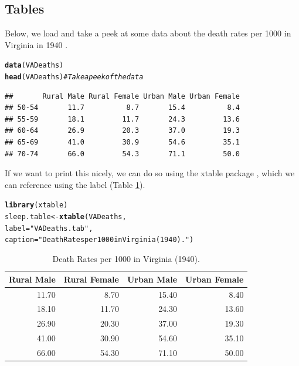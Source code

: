\documentclass{article}\usepackage[]{graphicx}\usepackage[]{xcolor}
\makeatletter
\newcommand{\hlsng}[1]{\textcolor[rgb]{0.192,0.494,0.8}{#1}}%
\newcommand{\hlcom}[1]{\textcolor[rgb]{0.678,0.584,0.686}{\textit{#1}}}%
\newcommand{\hldef}[1]{\textcolor[rgb]{0.345,0.345,0.345}{#1}}%
\newcommand{\hlkwb}[1]{\textcolor[rgb]{0.69,0.353,0.396}{#1}}%
\newcommand{\hlkwc}[1]{\textcolor[rgb]{0.333,0.667,0.333}{#1}}%
\newcommand{\hlkwd}[1]{\textcolor[rgb]{0.737,0.353,0.396}{\textbf{#1}}}%
\newenvironment{kframe}{%
 \def\at@end@of@kframe{}%
 \ifinner\ifhmode%
  \def\at@end@of@kframe{\end{minipage}}%
  \begin{minipage}{\columnwidth}%
 \fi\fi%
 \def\FrameCommand##1{\hskip\@totalleftmargin \hskip-\fboxsep
 \colorbox{shadecolor}{##1}\hskip-\fboxsep
     \hskip-\linewidth \hskip-\@totalleftmargin \hskip\columnwidth}%
 \MakeFramed {\advance\hsize-\width
   \@totalleftmargin\z@ \linewidth\hsize
   \@setminipage}}%
 {\par\unskip\endMakeFramed%
 \at@end@of@kframe}
\newenvironment{knitrout}{}{} %
\makeatother
\begin{document}
\begin{multicols}{2}
\subsection{Tables}
Below, we load and take a peek at some data about the death rates per 1000 in Virginia in 1940 \citep{deathRates}.
\begin{knitrout}\scriptsize
{}\color{fgcolor}\begin{kframe}
\begin{alltt}
\hlkwd{data}\hldef{(VADeaths)}
\hlkwd{head}\hldef{(VADeaths)} \hlcom{# Take a peek of the data}
\end{alltt}
\begin{verbatim}
##       Rural Male Rural Female Urban Male Urban Female
## 50-54       11.7          8.7       15.4          8.4
## 55-59       18.1         11.7       24.3         13.6
## 60-64       26.9         20.3       37.0         19.3
## 65-69       41.0         30.9       54.6         35.1
## 70-74       66.0         54.3       71.1         50.0
\end{verbatim}
\end{kframe}
\end{knitrout}
\indent If we want to print this nicely, we can do so using the xtable package \citep{xtable1}, which we can reference using the label (Table \ref{VADeaths.tab}).
\begin{knitrout}\scriptsize
{}\color{fgcolor}\begin{kframe}
\begin{alltt}
\hlkwd{library}\hldef{(xtable)}
\hldef{sleep.table}\hlkwb{<-}\hlkwd{xtable}\hldef{(VADeaths,}
                    \hlkwc{label} \hldef{=} \hlsng{"VADeaths.tab"}\hldef{,}
                    \hlkwc{caption} \hldef{=} \hlsng{"Death Rates per 1000 in Virginia (1940)."}\hldef{)}
\end{alltt}
\end{kframe}
\end{knitrout}
\begin{table}[H]
\centering
\begingroup\small
\begin{tabular}{rrrr}
  \hline
Rural Male & Rural Female & Urban Male & Urban Female \\ 
  \hline
11.70 & 8.70 & 15.40 & 8.40 \\ 
  18.10 & 11.70 & 24.30 & 13.60 \\ 
  26.90 & 20.30 & 37.00 & 19.30 \\ 
  41.00 & 30.90 & 54.60 & 35.10 \\ 
  66.00 & 54.30 & 71.10 & 50.00 \\ 
   \hline
\end{tabular}
\endgroup
\caption{Death Rates per 1000 in Virginia (1940).} 
\label{VADeaths.tab}
\end{table}

\begin{tiny}

\end{tiny}
\end{multicols}
\end{document}
